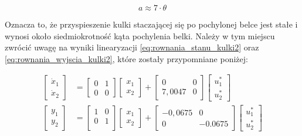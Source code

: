 \begin{equation}
    a \approx 7 \cdot \theta \label{eq:przyspieszenie_kulki3}
\end{equation}

Oznacza to, że przyspieszenie kulki staczającej się po pochylonej belce jest stałe i wynosi około siedmiokrotność kąta pochylenia belki. Należy w tym miejscu zwrócić uwagę na wyniki linearyzacji \eqref{eq:rownania_stanu_kulki2} oraz \eqref{eq:rownania_wyjscia_kulki2}, które zostały przypomniane poniżej:

\begin{align*}
    \begin{bmatrix}
        \dot{x}_1 \\ \dot{x}_2
    \end{bmatrix}
    &= \begin{bmatrix}
        0 & 1 \\
        0 & 0
    \end{bmatrix}
    \begin{bmatrix}
        x_1 \\ x_2
    \end{bmatrix}
    +
    \begin{bmatrix}
        0 & 0 \\ 7,0047 & 0
    \end{bmatrix}
    \begin{bmatrix}
        u_1^* \\ u_2^*
    \end{bmatrix}\\
    \begin{bmatrix}
        y_1 \\ y_2
    \end{bmatrix}
    &= \begin{bmatrix}
        1 & 0 \\
        0 & 1 \\
    \end{bmatrix}
    \begin{bmatrix}
        x_1 \\ x_2
    \end{bmatrix}
    + \begin{bmatrix}
        -0,0675 & 0 \\
        0 & -0.0675
    \end{bmatrix}
    \begin{bmatrix}
        u_1^* \\ u_2^*
    \end{bmatrix}
\end{align*}

